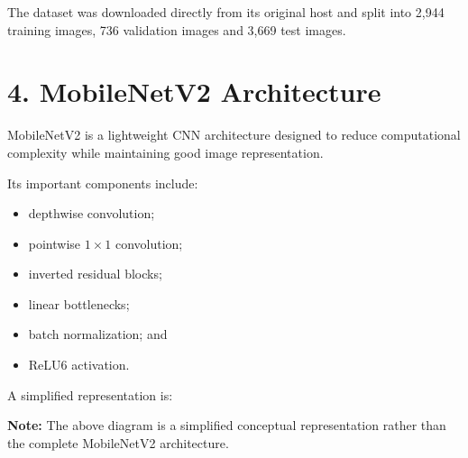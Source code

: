 \documentclass[10pt]{article}
\begin{document}
The dataset was downloaded directly from its original host and split into
2,944 training images, 736 validation images and 3,669 test images.

\section*{4. MobileNetV2 Architecture}

MobileNetV2 is a lightweight CNN architecture designed to reduce computational
complexity while maintaining good image representation.

Its important components include:

\begin{itemize}
\item depthwise convolution;
\item pointwise $1\times1$ convolution;
\item inverted residual blocks;
\item linear bottlenecks;
\item batch normalization; and
\item ReLU6 activation.
\end{itemize}

A simplified representation is:

\begin{center}
\end{center}

\textbf{Note:} The above diagram is a simplified conceptual representation
rather than the complete MobileNetV2 architecture.

\end{document}
